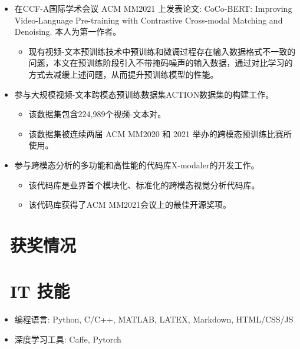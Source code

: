 \documentclass{resume}
\begin{document}
\begin{itemize}
  \item 在CCF-A国际学术会议 ACM MM2021 上发表论文: CoCo-BERT: Improving Video-Language Pre-training with Contrastive Cross-modal Matching and Denoising. 本人为第一作者。
  \begin{itemize}
    \item 现有视频-文本预训练技术中预训练和微调过程存在输入数据格式不一致的问题，本文在预训练阶段引入不带掩码噪声的输入数据，通过对比学习的方式去减缓上述问题，从而提升预训练模型的性能。
  \end{itemize}
  \item 参与大规模视频-文本跨模态预训练数据集ACTION数据集的构建工作。
  \begin{itemize}
    \item 该数据集包含224,989个视频-文本对。
    \item 该数据集被连续两届 ACM MM2020 和 2021 举办的跨模态预训练比赛所使用。
  \end{itemize}
  \item 参与跨模态分析的多功能和高性能的代码库X-modaler的开发工作。
  \begin{itemize}
    \item 该代码库是业界首个模块化、标准化的跨模态视觉分析代码库。
    \item 该代码库获得了ACM MM2021会议上的最佳开源奖项。
  \end{itemize}
\end{itemize}

\section{\faHeartO\ 获奖情况}

\section{\faCogs\ IT 技能}
\begin{itemize}[parsep=0.5ex]
  \item 编程语言: Python, C/C++, MATLAB, LATEX, Markdown, HTML/CSS/JS
  \item 深度学习工具: Caffe, Pytorch
\end{itemize}


%
%
\end{document}
